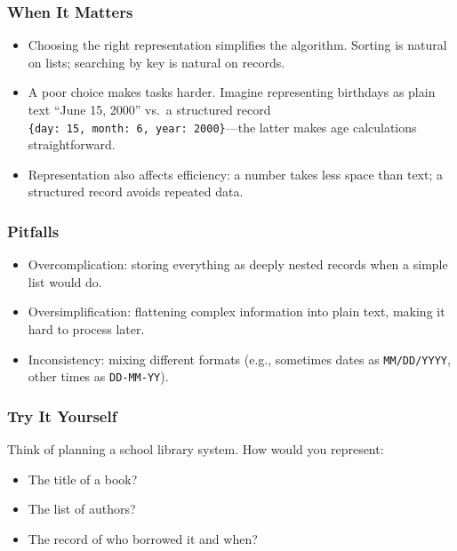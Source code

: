 \documentclass[
  letterpaper,
  DIV=11,
  numbers=noendperiod]{scrreprt}
\providecommand{\tightlist}{%
  \setlength{\itemsep}{0pt}\setlength{\parskip}{0pt}}
\begin{document}
\subsubsection{When It Matters}\label{when-it-matters-3}

\begin{itemize}
\tightlist
\item
  Choosing the right representation simplifies the algorithm. Sorting is
  natural on lists; searching by key is natural on records.
\item
  A poor choice makes tasks harder. Imagine representing birthdays as
  plain text ``June 15, 2000'' vs.~a structured record
  \texttt{\{day:\ 15,\ month:\ 6,\ year:\ 2000\}}---the latter makes age
  calculations straightforward.
\item
  Representation also affects efficiency: a number takes less space than
  text; a structured record avoids repeated data.
\end{itemize}

\subsubsection{Pitfalls}\label{pitfalls-2}

\begin{itemize}
\tightlist
\item
  Overcomplication: storing everything as deeply nested records when a
  simple list would do.
\item
  Oversimplification: flattening complex information into plain text,
  making it hard to process later.
\item
  Inconsistency: mixing different formats (e.g., sometimes dates as
  \texttt{MM/DD/YYYY}, other times as \texttt{DD-MM-YY}).
\end{itemize}

\subsubsection{Try It Yourself}\label{try-it-yourself-5}

Think of planning a school library system. How would you represent:

\begin{itemize}
\tightlist
\item
  The title of a book?
\item
  The list of authors?
\item
  The record of who borrowed it and when?
\end{itemize}
\end{document}
